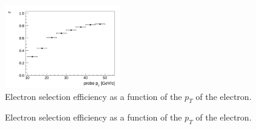 \begin{figure}[!htbp]
\begin{center}
\includegraphics[width=0.45\textwidth]{figures/ElectronEff_VsPt.pdf}
\caption{Electron selection efficiency as a function of the $p_{T}$ of the electron.}
\label{fig:ele_selectionEfficiency_VsPt}
\end{center}
\end{figure}


\begin{figure}[!htbp]
\begin{center}
\caption{Electron selection efficiency as a function of the $p_{T}$ of the electron.}
\label{fig:ele_selectionEfficiency_VsEta}
\end{center}
\end{figure}



